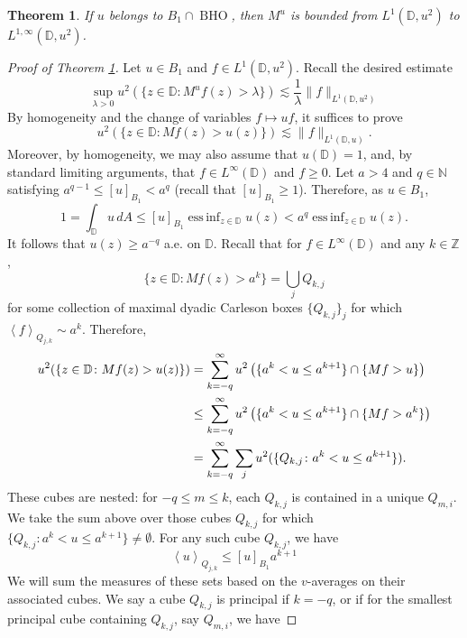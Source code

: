 \documentclass[10pt,a4paper]{amsart}
\newtheorem{theorem}{Theorem}
\DeclareMathOperator{\BHO}{BHO}
\newcommand{\avg}[1]{\left\langle {#1}\right\rangle}
\begin{document}
\begin{theorem}\label{thm:max-1} If $u$ belongs to $B_1 \cap \BHO$, then $M^u$ is bounded from $L^1(\mathbb{D}, u^2)$ to $L^{1,\infty}(\mathbb{D},u^2)$.
\end{theorem}

\begin{proof}[Proof of Theorem \ref{thm:max-1}]
    Let $u \in B_1$ and $f \in L^1(\mathbb{D},u^2)$. Recall the desired estimate
    \[
        \sup_{\lambda > 0} u^2(\{z \in \mathbb{D} \colon M^uf(z) > \lambda \}) \lesssim \frac{1}{\lambda}\|f\|_{L^1(\mathbb{D},u^2)}
    \]
    By homogeneity and the change of variables $f \mapsto uf$, it suffices to prove
    \[
        u^2(\{z \in \mathbb{D} \colon Mf(z) > u(z)\}) \lesssim \|f\|_{L^1(\mathbb{D},u)}.
    \]
    Moreover, by homogeneity, we may also assume that $u(\mathbb{D}) = 1$, and, by standard limiting arguments, that $f \in L^\infty(\mathbb{D})$ and $f \ge 0$. Let $a > 4$ and $q \in \mathbb{N}$ satisfying $a^{q-1} \le [u]_{B_1} < a^q$ (recall that $[u]_{B_1} \ge 1$). Therefore, as $u \in B_1$,
    \[
        1 = \int_\mathbb{D}u\,dA \le [u]_{B_1}\operatorname{ess\,inf}_{z \in \mathbb{D}} u(z) < a^q\operatorname{ess\,inf}_{z \in \mathbb{D}}u(z).
    \]
    It follows that $u(z) \ge a^{-q}$ a.e. on $\mathbb{D}$. Recall that for $f \in L^\infty(\mathbb{D})$ and any $k \in \mathbb Z$,
    \[
        \{z \in \mathbb{D} \colon Mf(z) > a^k \} = \bigcup_{j}Q_{k,j}
    \]
    for some collection of maximal dyadic Carleson boxes $\{Q_{k,j}\}_j$ for which $\avg{f}_{Q_{j,k}} \sim a^k$. Therefore, 
    \begin{align}
        \notag u^2(\{z \in \mathbb{D} \colon Mf(z) > u(z) \}) 
        &= \sum_{k = -q}^\infty u^2\left(\{ a^k < u \le a^{k+1}\} \cap \{ Mf > u \}\right)\\
        \notag &\le \sum_{k = -q}^\infty u^2\left(\{ a^k < u \le a^{k+1}\} \cap \{ Mf > a^k \}\right)\\
        &= \sum_{k = -q}^\infty \sum_{j}u^2(\{Q_{k,j} \colon a^k < u \le a^{k+1}\}). \label{e:B1-step-1}
    \end{align}
   These cubes are nested: for $-q \le m \le k$, each $Q_{k,j}$ is contained in a unique $Q_{m,i}$. We take the sum above over those cubes $Q_{k,j}$ for which $\{Q_{k,j} \colon a^k < u \le a^{k+1}\} \neq \emptyset$. For any such cube $Q_{k,j}$, we have
    \begin{equation}\label{e:avg_est}
        \avg{u}_{Q_{j,k}} \le [u]_{B_1} a^{k+1}
    \end{equation}
    We will sum the measures of these sets based on the $v$-averages on their associated cubes. We say a cube $Q_{k,j}$ is principal if $k = -q$, or if for the smallest principal cube containing $Q_{k,j}$, say $Q_{m,i}$, we have

\end{proof}
\end{document}
